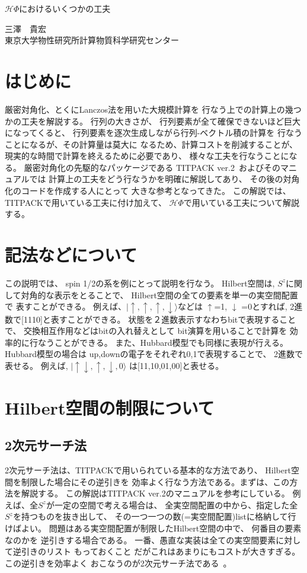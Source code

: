\documentclass[prb,aps,showpacs,preprint,nofootinbib]{revtex4}
\newcommand{\up}{\uparrow}
\newcommand{\down}{\downarrow}
\newcommand{\HPhi}{\mathcal{H}\Phi}
\begin{document}
\begin{center}\LARGE
$\mathcal H\Phi$におけるいくつかの工夫
\end{center}
\begin{flushright}\large
三澤　貴宏 \\
東京大学物性研究所計算物質科学研究センター
\end{flushright}

\section{はじめに}
\label{sec:intro}
厳密対角化、とくにLanczos法を用いた大規模計算を
行なう上での計算上の幾つかの工夫を解説する。
行列の大きさが、
行列要素が全て確保できないほど巨大になってくると、
行列要素を逐次生成しながら行列-ベクトル積の計算を
行なうことになるが、その計算量は莫大に
なるため、計算コストを削減することが、
現実的な時間で計算を終えるために必要であり、
様々な工夫を行なうことになる。
厳密対角化の先駆的なパッケージである
TITPACK ver.2~\cite{titpack}およびそのマニュアルでは
計算上の工夫をどう行なうかを明確に解説してあり、
その後の対角化のコードを作成する人にとって
大きな参考となってきた。
この解説では、TITPACKで用いている工夫に付け加えて、
$\HPhi$で用いている工夫について解説する。

\section{記法などについて}
この説明では、
spin 1/2の系を例にとって説明を行なう。
Hilbert空間は,
$S^{z}$に関して対角的な表示をとることで、
Hilbert空間の全ての要素を単一の実空間配置で
表すことができる。
例えば、$|\up,\up,\up,\down\rangle$などは
$\up$=1, $\down$ =0とすれば,
2進数で[1110]と表すことができる。
状態を２進数表示すなわちbitで表現することで、
交換相互作用などはbitの入れ替えとして
bit演算を用いることで計算を
効率的に行なうことができる。
また、Hubbard模型でも同様に表現が行える。
Hubbard模型の場合は
up,downの電子をそれぞれ0,1で表現することで、
2進数で表せる。
例えば, $|\up\down,\up,\down,0\rangle$
は[11,10,01,00]と表せる。


\section{Hilbert空間の制限について}
\subsection{2次元サーチ法}
\label{sec:OgataLin}
2次元サーチ法は、TITPACKで用いられている基本的な方法であり、
Hilbert空間を制限した場合にその逆引きを
効率よく行なう方法である。まずは、この方法を解説する。
この解説はTITPACK ver.2のマニュアルを参考にしている。
例えば、全$S^z$が一定の空間で考える場合は、
全実空間配置の中から、指定した全
$S^z$を持つものを抜き出して、
その一つ一つの数(=実空間配置)listに格納して行けばよい。
問題はある実空間配置が制限したHilbert空間の中で、
何番目の要素なのかを
逆引きする場合である。
一番、愚直な実装は全ての実空間要素に対して逆引きのリスト
もっておくこと
だがこれはあまりにもコストが大きすぎる。
この逆引きを効率よく
おこなうのが2次元サーチ法である~\cite{Lin,titpack}。
\end{document}
